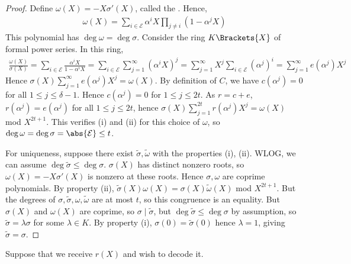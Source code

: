 \begin{proof}
    Define $\omega(X) = -X\sigma'(X)$, called the .
    Hence,
    \begin{align*}
        \omega(X) = \sum_{i \in \mathcal E} \alpha^i X \prod_{j \neq i} (1 - \alpha^j X)
    \end{align*}
    This polynomial has $\deg \omega = \deg \sigma$.
    Consider the ring $K\Brackets{X}$ of formal power series.
    In this ring,
    \begin{align*}
        \frac{\omega(X)}{\sigma(X)} = \sum_{i \in \mathcal E} \frac{\alpha^i X}{1 - \alpha^i X} = \sum_{i \in \mathcal E} \sum_{j = 1}^\infty (\alpha^i X)^j = \sum_{j=1}^\infty X^j \sum_{i \in \mathcal E} (\alpha^j)^i = \sum_{j=1}^\infty e(\alpha^j) X^j
    \end{align*}
    Hence $\sigma(X) \sum_{j=1}^\infty e(\alpha^j) X^j = \omega(X)$.
    By definition of $C$, we have $c(\alpha^j) = 0$ for all $1 \leq j \leq \delta - 1$.
    Hence $c(\alpha^j) = 0$ for $1 \leq j \leq 2t$.
    As $r = c + e$, $r(\alpha^j) = e(\alpha^j)$ for all $1 \leq j \leq 2t$, hence $\sigma(X) \sum_{j=1}^{2t} r(\alpha^j) X^j = \omega(X)$ mod $X^{2t+1}$.
    This verifies (i) and (ii) for this choice of $\omega$, so $\deg \omega = \deg \sigma = \abs{\mathcal E} \leq t$.

    For uniqueness, suppose there exist $\widetilde \sigma, \widetilde \omega$ with the properties (i), (ii).
    WLOG, we can assume $\deg \widetilde \sigma \leq \deg \sigma$.
    $\sigma(X)$ has distinct nonzero roots, so $\omega(X) = -X\sigma'(X)$ is nonzero at these roots.
    Hence $\sigma, \omega$ are coprime polynomials.
    By property (ii), $\widetilde \sigma(X) \omega(X) = \sigma(X) \widetilde \omega(X)$ mod $X^{2t+1}$.
    But the degrees of $\sigma, \widetilde \sigma, \omega, \widetilde \omega$ are at most $t$, so this congruence is an equality.
    But $\sigma(X)$ and $\omega(X)$ are coprime, so $\sigma \mid \widetilde \sigma$, but $\deg \widetilde \sigma \leq \deg \sigma$ by assumption, so $\widetilde \sigma = \lambda \sigma$ for some $\lambda \in K$.
    By property (i), $\sigma(0) = \widetilde\sigma(0)$ hence $\lambda = 1$, giving $\widetilde \sigma = \sigma$.
\end{proof}

Suppose that we receive $r(X)$ and wish to decode it.

